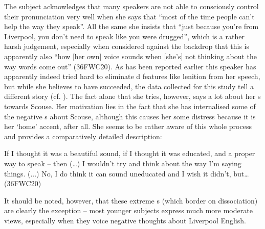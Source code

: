 The subject acknowledges that many speakers are not able to consciously control their pronunciation very well when she says that ``most of the time people can't help the way they speak''.
All the same she insists that ``just because you're from Liverpool, you don't need to speak like you were drugged'', which is a rather harsh judgement, especially when considered against the backdrop that this is apparently also ``how [her own] voice sounds when [she's] not thinking about the way words come out'' (36FWC20).
As has been reported earlier this speaker has apparently indeed tried hard to eliminate d features like lenition from her speech, but while she believes to have succeeded, the data collected for this study tell a different story (cf. ).
The fact alone that she tries, however, says a lot about her s towards Scouse.
Her motivation lies in the fact that she has internalised some of the negative s about Scouse, although this causes her some distress because it is her `home' accent, after all.
She seems to be rather aware of this whole process and provides a comparatively detailed description:
\begin{example}
	If I thought it was a beautiful sound, if I thought it was educated, and  a proper way to speak -- then (\ldots) I wouldn't try and think about the way I'm saying things. (...) No, I do think it can sound uneducated and I wish it didn't, but\ldots (36FWC20)
\end{example}
It should be noted, however, that these extreme s (which border on dissociation) are clearly the exception -- most younger subjects express much more moderate views, especially when they voice negative thoughts about Liverpool English.